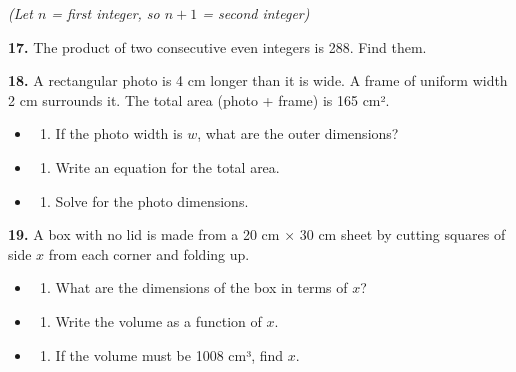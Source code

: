 \documentclass[
  11pt,
]{article}
\providecommand{\tightlist}{%
  \setlength{\itemsep}{0pt}\setlength{\parskip}{0pt}}
\begin{document}
\emph{(Let \(n\) = first integer, so \(n + 1\) = second integer)}

\textbf{17.} The product of two consecutive even integers is 288. Find
them.

\textbf{18.} A rectangular photo is 4 cm longer than it is wide. A frame
of uniform width 2 cm surrounds it. The total area (photo + frame) is
165 cm².

\begin{itemize}
\item
  \begin{enumerate}
  \def\labelenumi{(\alph{enumi})}
  \tightlist
  \item
    If the photo width is \(w\), what are the outer dimensions?
  \end{enumerate}
\item
  \begin{enumerate}
  \def\labelenumi{(\alph{enumi})}
  \setcounter{enumi}{1}
  \tightlist
  \item
    Write an equation for the total area.
  \end{enumerate}
\item
  \begin{enumerate}
  \def\labelenumi{(\alph{enumi})}
  \setcounter{enumi}{2}
  \tightlist
  \item
    Solve for the photo dimensions.
  \end{enumerate}
\end{itemize}

\textbf{19.} A box with no lid is made from a 20 cm × 30 cm sheet by
cutting squares of side \(x\) from each corner and folding up.

\begin{itemize}
\item
  \begin{enumerate}
  \def\labelenumi{(\alph{enumi})}
  \tightlist
  \item
    What are the dimensions of the box in terms of \(x\)?
  \end{enumerate}
\item
  \begin{enumerate}
  \def\labelenumi{(\alph{enumi})}
  \setcounter{enumi}{1}
  \tightlist
  \item
    Write the volume as a function of \(x\).
  \end{enumerate}
\item
  \begin{enumerate}
  \def\labelenumi{(\alph{enumi})}
  \setcounter{enumi}{2}
  \tightlist
  \item
    If the volume must be 1008 cm³, find \(x\).
  \end{enumerate}
\end{itemize}
\end{document}
